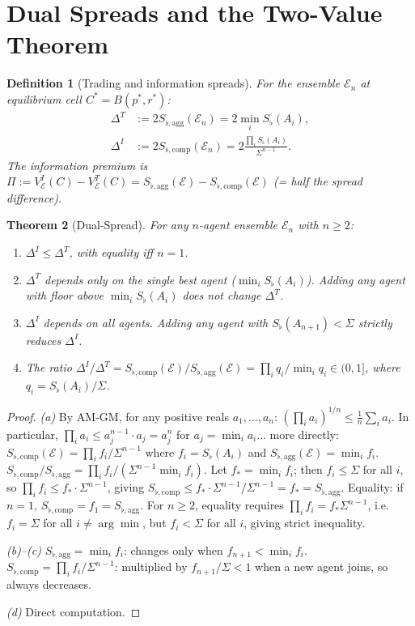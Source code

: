 \documentclass[twocolumn,11pt,a4paper]{article}
\newtheorem{theorem}{Theorem}[section]
\newtheorem{definition}[theorem]{Definition}
\theoremstyle{remark}
\newcommand{\Sflat}{S_{\flat}}
\newcommand{\Ens}{\mathcal{E}}
\newcommand{\MidP}{p^*}                  %
\newcommand{\SpreadT}{\Delta^T}          %
\newcommand{\SpreadI}{\Delta^I}          %
\newcommand{\ValT}{V^T}                  %
\newcommand{\ValI}{V^I}                  %
\newcommand{\SflatT}{S_{\flat,\mathrm{agg}}}        %
\newcommand{\SflatI}{S_{\flat,\mathrm{comp}}}       %
\newcommand{\Prem}{\Pi}                  %
\begin{document}
\section{Dual Spreads and the Two-Value Theorem}
\label{sec:dual-spread}

\begin{definition}[Trading and information spreads]
\label{def:spreads}
For the ensemble $\Ens_n$ at equilibrium cell $C^* = B(\MidP, r^*)$:
\begin{align}
  \SpreadT &:= 2\SflatT(\Ens_n) = 2\min_i \Sflat(A_i), \label{eq:st}\\
  \SpreadI &:= 2\SflatI(\Ens_n) = 2\frac{\prod_i \Sflat(A_i)}{\Sigma^{n-1}}.
  \label{eq:si}
\end{align}
The \emph{information premium} is $\Prem := \ValI_\Ens(C) - \ValT_\Ens(C)
= \SflatT(\Ens) - \SflatI(\Ens)$ (= half the spread difference).
\end{definition}

\begin{theorem}[Dual-Spread]
\label{thm:dual-spread}
For any $n$-agent ensemble $\Ens_n$ with $n \ge 2$:
\begin{enumerate}[label=\textup{(\alph*)}]
\item $\SpreadI \le \SpreadT$, with equality iff $n=1$.
\item $\SpreadT$ depends only on the single best agent ($\min_i \Sflat(A_i)$).
  Adding any agent with floor above $\min_i \Sflat(A_i)$ does not change
  $\SpreadT$.
\item $\SpreadI$ depends on all agents.  Adding any agent with
  $\Sflat(A_{n+1}) < \Sigma$ strictly reduces $\SpreadI$.
\item The ratio $\SpreadI/\SpreadT = \SflatI(\Ens)/\SflatT(\Ens)
  = \prod_{i} q_i / \min_i q_i \in (0,1]$, where $q_i = \Sflat(A_i)/\Sigma$.
\end{enumerate}
\end{theorem}
\begin{proof}
\textit{(a)}  By AM-GM, for any positive reals $a_1,\ldots,a_n$:
$(\prod_i a_i)^{1/n} \le \frac{1}{n}\sum_i a_i$.  In particular,
$\prod_i a_i \le a_j^{n-1} \cdot a_j = a_j^n$ for $a_j = \min_i a_i$...
more directly: $\SflatI(\Ens) = \prod_i f_i/\Sigma^{n-1}$ where
$f_i = \Sflat(A_i)$ and $\SflatT(\Ens) = \min_i f_i$.
$\SflatI/\SflatT = \prod_i f_i / (\Sigma^{n-1} \min_i f_i)$.
Let $f_* = \min_i f_i$; then $f_i \le \Sigma$ for all $i$, so
$\prod_i f_i \le f_* \cdot \Sigma^{n-1}$, giving
$\SflatI \le f_* \cdot \Sigma^{n-1}/\Sigma^{n-1} = f_* = \SflatT$.
Equality: if $n=1$, $\SflatI = f_1 = \SflatT$.  For $n \ge 2$, equality
requires $\prod_i f_i = f_* \Sigma^{n-1}$, i.e.\ $f_i = \Sigma$ for all
$i \ne \arg\min$, but $f_i < \Sigma$ for all $i$, giving strict inequality.

\textit{(b)--(c)}  $\SflatT = \min_i f_i$: changes only when $f_{n+1} <
\min_i f_i$.  $\SflatI = \prod_i f_i/\Sigma^{n-1}$: multiplied by
$f_{n+1}/\Sigma < 1$ when a new agent joins, so always decreases.

\textit{(d)}  Direct computation.
\end{proof}
\end{document}
